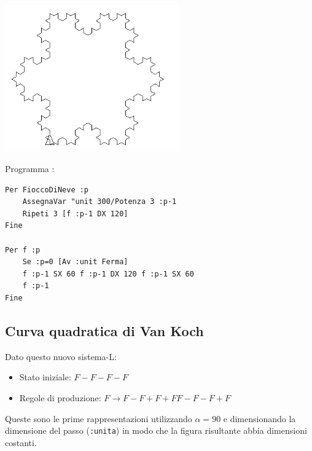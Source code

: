 \begin{center}
\begin{minipage}{7.5cm}
	\end{minipage}
	\begin{minipage}{7.5cm}
		\includegraphics[width=7.5cm]{pics/linden-flocon4.png}
	\end{minipage}
\end{center}

Programma \xlogo:
\begin{lstlisting}[caption="Il fiocco di neve"]
Per FioccoDiNeve :p
	AssegnaVar "unit 300/Potenza 3 :p-1
	Ripeti 3 [f :p-1 DX 120]  
Fine

Per f :p
	Se :p=0 [Av :unit Ferma]
	f :p-1 SX 60 f :p-1 DX 120 f :p-1 SX 60
	f :p-1 
Fine
\end{lstlisting}


\subsection{Curva quadratica di Van Koch}
Dato questo nuovo sistema-L:
\begin{itemize}
 \item[\textbullet] Stato iniziale: $F-F-F-F$
 \item[\textbullet] Regole di produzione: $F\rightarrow F-F+F+FF-F-F+F$
\end{itemize}

Queste sono le prime rappresentazioni utilizzando $\alpha=90$ e dimensionando la dimensione del passo (\texttt{:unita}) in modo che la figura risultante abbia dimensioni costanti.

